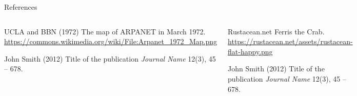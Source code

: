 \begin{frame}{References}
    \begin{columns}[c]


        \footnotesize {
            \begin{thebibliography}{9}

                 UCLA and BBN (1972)
                \newblock The map of ARPANET in March 1972.
                \newblock \url{https://commons.wikimedia.org/wiki/File:Arpanet_1972_Map.png}

                 John Smith (2012)
                \newblock Title of the publication
                \newblock \emph{Journal Name} 12(3), 45 -- 678.

            \end{thebibliography}
        }


        \footnotesize {
            \begin{thebibliography}{9}

                 Rustacean.net
                \newblock Ferris the Crab.
                \newblock \url{https://rustacean.net/assets/rustacean-flat-happy.png}

                 John Smith (2012)
                \newblock Title of the publication
                \newblock \emph{Journal Name} 12(3), 45 -- 678.

            \end{thebibliography}
        }

    \end{columns}
\end{frame}
